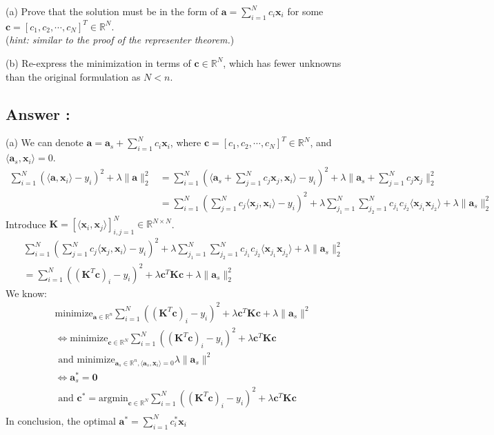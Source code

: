 \documentclass[a4paper,12pt]{article}
\newcommand{\R}{\mathbb{R}}
\begin{document}
(a) Prove that the solution must be in the form of \(\bm{a} = \sum_{i = 1}^N c_i \bm{x}_i\) for some \(\bm{c} = [c_1, c_2, \cdots, c_N]^T \in \R^N\). \\
(\textit{hint: similar to the proof of the representer theorem.})

(b) Re-express the minimization in terms of \(\bm{c} \in \R^N\), which has fewer unknowns than the original formulation as \(N < n\).


\subsection*{Answer :}
(a) We can denote \(\bm{a} = \bm{a}_s + \sum_{i=1}^N c_i \bm{x}_i\), where \(\bm{c} = [c_1, c_2, \cdots, c_N]^T \in \R^N\), and \(\langle \bm{a}_s, \bm{x}_i\rangle = 0\).
\begin{align*}
    \sum_{i = 1}^N (\langle \bm{a}, \bm{x}_i\rangle - y_i)^2 + \lambda\|\bm{a}\|_2^2 &= \sum_{i = 1}^N (\langle \bm{a}_s + \sum_{j=1}^N c_j \bm{x}_j, \bm{x}_i\rangle - y_i)^2 + \lambda\| \bm{a}_s + \sum_{j=1}^N c_j \bm{x}_j\|_2^2   \\
    &= \sum_{i = 1}^N ( \sum_{j=1}^N c_j \langle \bm{x}_j, \bm{x}_i\rangle - y_i)^2 + \lambda\sum_{j_1=1}^N \sum_{j_2=1}^N c_{j_1}c_{j_2} \langle \bm{x}_{j_1}\bm{x}_{j_2}\rangle + \lambda \|\bm{a}_s\|_2^2
\end{align*}
Introduce \(\bm{K} = [\langle \bm{x}_i, \bm{x}_j \rangle]_{i, j = 1}^N \in \R^{N \times N}\).
\begin{align*}
    &\sum_{i = 1}^N ( \sum_{j=1}^N c_j \langle \bm{x}_j, \bm{x}_i\rangle - y_i)^2 + \lambda\sum_{j_1=1}^N \sum_{j_2=1}^N c_{j_1}c_{j_2} \langle \bm{x}_{j_1}\bm{x}_{j_2}\rangle + \lambda \|\bm{a}_s\|_2^2 \\
    &=\sum_{i = 1}^N ((\bm{K}^T\bm{c})_i - y_i)^2 + \lambda \bm{c}^T \bm{K} \bm{c} + \lambda \|\bm{a}_s\|_2^2  
\end{align*}
We know:
\begin{align*}
    &\text{minimize}_{\bm{a} \in \R^n} \sum_{i = 1}^N ((\bm{K}^T\bm{c})_i - y_i)^2 + \lambda \bm{c}^T \bm{K} \bm{c} + \lambda \|\bm{a}_s\|^2   \\
    &\iff \text{minimize}_{\bm{c} \in \R^N} \sum_{i = 1}^N ((\bm{K}^T\bm{c})_i - y_i)^2 + \lambda \bm{c}^T \bm{K} \bm{c} \\ 
    &\text{ and } \text{minimize}_{\bm{a}_s \in \R^n, \langle \bm{a}_s, \bm{x}_i\rangle = 0} \lambda \|\bm{a}_s\|^2  \\
    &\iff \bm{a}_s^* = \bm{0} \\
    &\text{ and } \bm{c}^* = \text{argmin}_{\bm{c} \in \R^N} \sum_{i = 1}^N ((\bm{K}^T\bm{c})_i - y_i)^2 + \lambda \bm{c}^T \bm{K} \bm{c} \\ 
\end{align*}
In conclusion, the optimal \(\bm{a}^* = \sum_{i = 1}^N c_i^* \bm{x}_i\)
\end{document}
